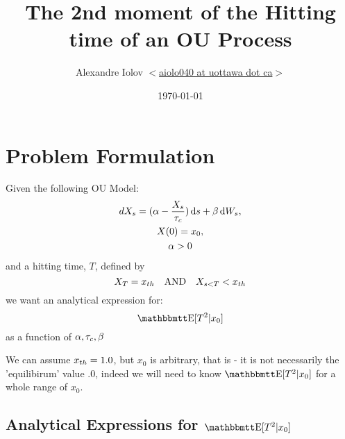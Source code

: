 \documentclass{article}
\begin{document}
\title{The 2nd moment of the Hitting time of an OU Process} 
\author{Alexandre Iolov 
$<$\href{mailto:aiolo040@uottawa.ca}
		{aiolo040 at uottawa dot ca}$>$}

\date{\today}

\maketitle


\def \t {{ T}}

\section{Problem Formulation}
Given the following OU Model:
\begin{equation}
\begin{gathered}
dX_s = ({\alpha} - \frac{X_s}{{ \tau_{c} }} ) \, \mathrm{d} s + {\beta} \, \mathrm{d} W_s,
\\
X(0) = x_0,
\\
{\alpha} > 0
\end{gathered}
\label{eq:X_evolution_uo}
\end{equation}
and a hitting time, $\t$, defined by
\begin{equation}
X_\t = \xth 
\quad \textrm{AND} \quad
X_{s < \t} < \xth
\end{equation}
we want an analytical expression for:
\begin{equation}
\Exp[\t^2|x_0]
\end{equation}
as a function of ${\alpha},{ \tau_{c} },{\beta}$

We can assume ${ x_{th} } = 1.0$, but $x_0$ is arbitrary, that is - it is not
necessarily the 'equilibirum' value $.0$, indeed we will need to know
$\Exp[\t^2|x_0]$ for a whole range of $x_0$.

\subsection{Analytical Expressions for $\Exp[\t^2|x_0]$}
\end{document}

